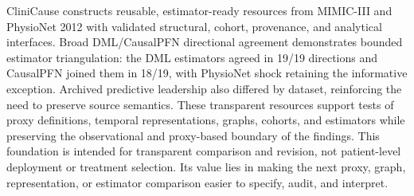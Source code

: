 \documentclass[letterpaper]{article}
\begin{document}
CliniCause constructs reusable, estimator-ready resources from MIMIC-III and
PhysioNet 2012 with validated structural, cohort, provenance, and analytical
interfaces. Broad DML/CausalPFN directional agreement demonstrates bounded
estimator triangulation: the DML estimators agreed in 19/19 directions and
CausalPFN joined them in 18/19, with PhysioNet shock retaining the informative
exception. Archived predictive leadership also differed by dataset, reinforcing
the need to preserve source semantics. These transparent resources support tests
of proxy definitions, temporal representations, graphs, cohorts, and estimators
while preserving the observational and proxy-based boundary of the findings.
This foundation is intended for transparent comparison and revision, not
patient-level deployment or treatment selection. Its value lies in making the
next proxy, graph, representation, or estimator comparison easier to specify,
audit, and interpret.


   
\end{document}

